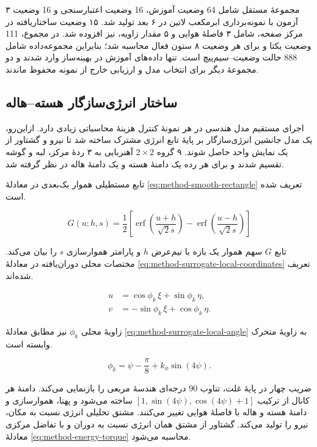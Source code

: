 ۳ مجموعهٔ مستقل شامل 64 وضعیت آموزش، 16 وضعیت اعتبارسنجی و 16 وضعیت آزمون با نمونه‌برداری ابرمکعب لاتین در ۶ بعد تولید شد. ۱۵ وضعیت ساختاریافته در مرکز صفحه، شامل ۳ فاصلهٔ هوایی و ۵ مقدار زاویه، نیز افزوده شد. در مجموع، 111 وضعیت یکتا و برای هر وضعیت ۸ ستون فعال محاسبه شد؛ بنابراین مجموعه‌داده شامل 888 حالت وضعیت--سیم‌پیچ است. تنها داده‌های آموزش در بهینه‌ساز وارد شدند و دو مجموعهٔ دیگر برای انتخاب مدل و ارزیابی خارج از نمونه محفوظ ماندند.

\subsection{ساختار انرژی‌سازگار هسته--هاله}

اجرای مستقیم مدل هندسی در هر نمونهٔ کنترل هزینهٔ محاسباتی زیادی دارد. ازاین‌رو، یک مدل جانشین انرژی‌سازگار بر پایهٔ تابع انرژی مشترک ساخته شد تا نیرو و گشتاور از یک نمایش واحد حاصل شوند. ۹ گروه $2\times2$ آهنربایی به ۳ ردهٔ مرکز، لبه و گوشه تقسیم شدند و برای هر رده یک دامنهٔ هسته و یک دامنهٔ هاله در نظر گرفته شد.

تابع مستطیلی هموار یک‌بعدی در معادلهٔ \ref{eq:method-smooth-rectangle} تعریف شده است.

\begin{equation}
	G(u;h,s)=\frac{1}{2}\left[
	\operatorname{erf}\left(\frac{u+h}{\sqrt{2}s}\right)-
	\operatorname{erf}\left(\frac{u-h}{\sqrt{2}s}\right)
	\right]
	\label{eq:method-smooth-rectangle}
\end{equation}

تابع $G$ سهم هموار یک بازه با نیم‌عرض $h$ و پارامتر هموارسازی $s$ را بیان می‌کند. مختصات محلی دوران‌یافته در معادلهٔ \ref{eq:method-surrogate-local-coordinates} تعریف شده‌اند.

\begin{align}
	u&=\cos\phi_k\,\xi+\sin\phi_k\,\eta,\\
	v&=-\sin\phi_k\,\xi+\cos\phi_k\,\eta.
	\label{eq:method-surrogate-local-coordinates}
\end{align}

زاویهٔ محلی $\phi_k$ نیز مطابق معادلهٔ
 \ref{eq:method-surrogate-local-angle} به زاویهٔ متحرک وابسته است.

\begin{equation}
	\phi_k=\psi-\frac{\pi}{8}+k_\phi\sin(4\psi).
	\label{eq:method-surrogate-local-angle}
\end{equation}

ضریب چهار در پایهٔ غلت، تناوب 90 درجه‌ای هندسهٔ مربعی را بازنمایی می‌کند. دامنهٔ هر کانال از ترکیب $[1,\sin(4\psi),\cos(4\psi)+1]$ ساخته می‌شود و پهنا، هموارسازی و دامنهٔ هسته و هاله با فاصلهٔ هوایی تغییر می‌کنند. مشتق تحلیلی انرژی نسبت به مکان، نیرو را تولید می‌کند. گشتاور از مشتق همان انرژی نسبت به دوران و با تفاضل مرکزی معادلهٔ \ref{eq:method-energy-torque} محاسبه می‌شود.

